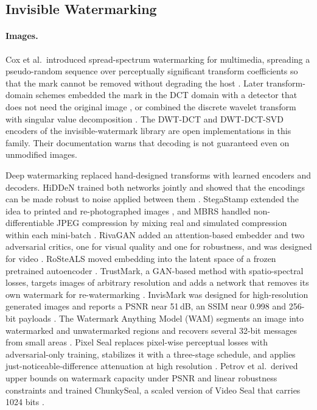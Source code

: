 \subsection{Invisible Watermarking}
\paragraph{Images.} Cox et al.\ introduced spread-spectrum watermarking for multimedia, spreading a pseudo-random sequence over perceptually significant transform coefficients so that the mark cannot be removed without degrading the host \cite{cox1997secure}. Later transform-domain schemes embedded the mark in the DCT domain with a detector that does not need the original image \cite{barni1998dct}, or combined the discrete wavelet transform with singular value decomposition \cite{ganic2004dwtsvd}. The DWT-DCT and DWT-DCT-SVD encoders of the invisible-watermark library \cite{invisiblewatermark} are open implementations in this family. Their documentation warns that decoding is not guaranteed even on unmodified images.

Deep watermarking replaced hand-designed transforms with learned encoders and decoders. HiDDeN trained both networks jointly and showed that the encodings can be made robust to noise applied between them \cite{zhu2018hidden}. StegaStamp extended the idea to printed and re-photographed images \cite{tancik2020stegastamp}, and MBRS handled non-differentiable JPEG compression by mixing real and simulated compression within each mini-batch \cite{jia2021mbrs}. RivaGAN added an attention-based embedder and two adversarial critics, one for visual quality and one for robustness, and was designed for video \cite{zhang2019rivagan}. RoSteALS moved embedding into the latent space of a frozen pretrained autoencoder \cite{bui2023rosteals}. TrustMark, a GAN-based method with spatio-spectral losses, targets images of arbitrary resolution and adds a network that removes its own watermark for re-watermarking \cite{bui2025trustmark}. InvisMark was designed for high-resolution generated images and reports a PSNR near 51\,dB, an SSIM near 0.998 and 256-bit payloads \cite{xu2025invismark}. The Watermark Anything Model (WAM) segments an image into watermarked and unwatermarked regions and recovers several 32-bit messages from small areas \cite{sander2025wam}. Pixel Seal replaces pixel-wise perceptual losses with adversarial-only training, stabilizes it with a three-stage schedule, and applies just-noticeable-difference attenuation at high resolution \cite{soucek2025pixelseal}. Petrov et al.\ derived upper bounds on watermark capacity under PSNR and linear robustness constraints and trained ChunkySeal, a scaled version of Video Seal that carries 1024 bits \cite{petrov2025chunkyseal}.

